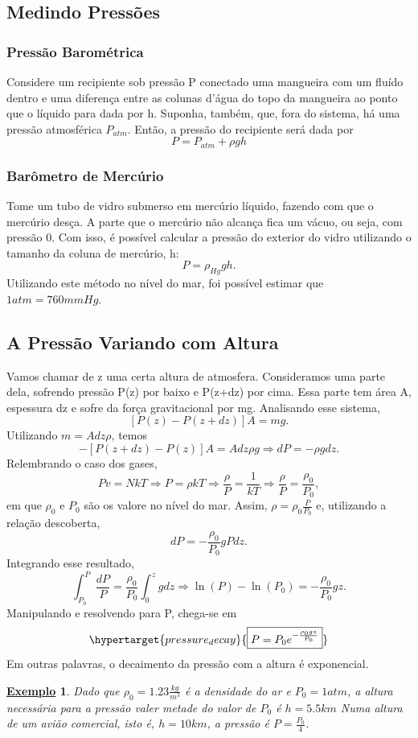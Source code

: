 \documentclass{article}
\newtheorem{example}{\underline{Exemplo}}
\begin{document}
\subsection{Medindo Pressões}
\subsubsection{Pressão Barométrica}
Considere um recipiente sob pressão P conectado uma mangueira com um fluído dentro e uma diferença entre as colunas d'água
do topo da mangueira ao ponto que o líquido para dada por h. Suponha, também, que, fora do sistema, há uma pressão atmosférica \(P_{atm}\).
Então, a pressão do recipiente será dada por 
\[
  P = P_{atm} + \rho gh
\]
\subsubsection{Barômetro de Mercúrio}
Tome um tubo de vidro submerso em mercúrio líquido, fazendo com que o mercúrio desça. A parte que o mercúrio não alcança fica um vácuo, ou seja, com pressão 0.
Com isso, é possível calcular a pressão do exterior do vidro utilizando o tamanho da coluna de mercúrio, h: 
\[
  P = \rho_{Hg}gh.
\]
Utilizando este método no nível do mar, foi possível estimar que \(1atm = 760mmHg\).

\subsection{A Pressão Variando com Altura}
Vamos chamar de z uma certa altura de atmosfera. Consideramos uma parte dela, sofrendo pressão P(z) por baixo e P(z+dz) por cima. Essa parte tem área A, espessura dz e sofre
da força gravitacional por mg. Analisando esse sistema, 
\[
  [P(z) - P(z+dz)]A = mg.
\]
Utilizando \(m = Adz\rho \), temos 
\[
  -[P(z+dz)-P(z)]A = Adz\rho g \Rightarrow dP = -\rho g dz.
\]
Relembrando o caso dos gases, 
\[
  Pv = NkT \Rightarrow P = \rho kT \Rightarrow \frac{\rho }{P} = \frac{1}{kT} \Rightarrow \frac{\rho }{P}=\frac{\rho_{0}}{P_{0}},
\]
em que \(\rho_{0}\) e \(P_{0}\) são os valore no nível do mar. Assim, \(\rho = \rho_{0} \frac{P}{P_{0}}\) e, utilizando a relação descoberta, 
\[
  dP = -\frac{\rho_{0}}{P_{0}}gPdz.
\]
Integrando esse resultado, 
\[
  \int_{P_{0}}^{P}\frac{dP}{P} = \frac{\rho_{0}}{P_{0}}\int_{0}^{z}gdz \Rightarrow \ln{(P)}-\ln{(P_{0})} = -\frac{\rho_{0}}{P_{0}}gz.
\]
Manipulando e resolvendo para P, chega-se em 
\[
  \hypertarget{pressure_decay}{\boxed{P = P_{0}e^{-\frac{\rho_{0}gz}{P_{0}}}}}
\]
Em outras palavras, o decaimento da pressão com a altura é exponencial.
\begin{example}
  Dado que \(\rho_{0} = 1.23\frac{kg}{m^{3}}\) é a densidade do ar e \(P_{0} = 1atm\), a altura necessária para a pressão valer metade do valor de \(P_{0}\) é \(h = 5.5km\)
  Numa altura de um avião comercial, isto é, \(h=10km\), a pressão é \(P = \frac{P_{0}}{4}\).
\end{example}
\end{document}
